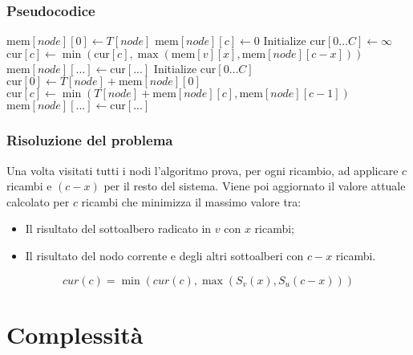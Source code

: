 \documentclass{beamer}
\begin{document}
\begin{frame}[allowframebreaks]
\frametitle{Pseudocodice}
\small\begin{breakablealgorithm}
\begin{algorithmic}[1]
     
        \State $\text{mem}[node][0] \gets T[node]$
            \State $\text{mem}[node][c] \gets 0$
        \EndFor 
        \State \Return
    \EndIf
    \framebreak
     
        \State {}
        \State Initialize $\text{cur}[0 \dots C] \gets \infty$
                \State $\text{cur}[c] \gets \min(\text{cur}[c], \max(\text{mem}[v][x], \text{mem}[node][c - x]))$
            \EndFor
        \EndFor
        \State $\text{mem}[node][...] \gets \text{cur}[...]$
    \EndFor
    \State Initialize $\text{cur}[0 \dots C]$
    \State $\text{cur}[0] \gets T[node] + \text{mem}[node][0]$
    \framebreak
     
        \State $\text{cur}[c] \gets \min(T[node] + \text{mem}[node][c], \text{mem}[node][c - 1])$
    \EndFor
    \State $\text{mem}[node][...] \gets \text{cur}[...]$
\EndProcedure
\end{algorithmic}
\end{breakablealgorithm}
\end{frame}

\begin{frame}
\frametitle{Risoluzione del problema}

Una volta visitati tutti i nodi l'algoritmo prova, per ogni ricambio, ad applicare $c$ ricambi e $(c - x)$ per il resto del sistema.
Viene poi aggiornato il valore attuale calcolato per $c$ ricambi che minimizza il massimo valore tra:
\begin{itemize}
   \item Il risultato del sottoalbero radicato in $v$ con $x$ ricambi;
   \item Il risultato del nodo corrente e degli altri sottoalberi con $c-x$ ricambi.
\end{itemize}

$$cur(c) = \min(cur(c), \max(S_v(x), S_u(c - x)))$$

\end{frame}

\section{Complessità}
\end{document}
